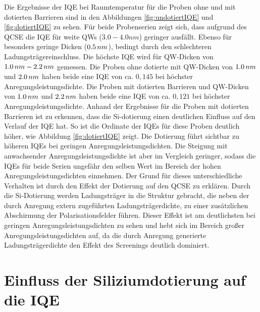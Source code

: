 \noindent 
Die Ergebnisse der IQE bei Raumtemperatur für die Proben ohne und mit dotierten Barrieren sind in den Abbildungen 
\ref{fig:undotiertIQE} und \ref{fig:dotiertIQE} zu sehen. Für beide Probenserien zeigt sich, dass aufgrund des QCSE die IQE für weite QWs 
($3.0 -4.0  nm$) geringer ausfällt. Ebenso für besonders geringe Dicken ($0.5\thinspace nm$), bedingt durch den schlechteren Ladungsträgereinschluss. Die höchste IQE wird für QW-Dicken von $1.0 \thinspace nm- 2.2 \thinspace nm$ gemessen. Die Proben ohne dotierte mit QW-Dicken von $1.0 \thinspace nm$ und $2.0\thinspace nm$ haben beide eine IQE von ca. $0,145$ bei höchster Anregungsleistungsdichte.
\newline
Die Proben mit dotierten Barrieren und QW-Dicken von $1.0 \thinspace nm$ und $2.2\thinspace nm$ haben beide eine IQE von ca. $0,121$ bei höchster Anregungsleistungsdichte. 
\newline
Anhand der Ergebnisse für die Proben mit dotierten Barrieren ist zu erkennen, dass die Si-dotierung einen deutlichen Einfluss auf den Verlauf der IQE hat. So ist die Ordinate der IQEs für diese Proben deutlich höher, wie Abbildung \ref{fig:dotiertIQE} zeigt. Die Dotierung führt sichtbar zu höheren IQEs bei geringen Anregungsleistungsdichten. Die Steigung mit anwachsender Anregungsleistungsdichte ist aber im Vergleich geringer, sodass die IQEs für beide Serien ungefähr den selben Wert im Bereich der hohen Anregungsleistungsdichten einnehmen. 
\newline
Der Grund für dieses unterschiedliche Verhalten ist durch den Effekt der Dotierung auf den QCSE zu erklären. Durch die Si-Dotierung werden Ladungsträger in die Struktur gebracht, die neben der durch Anregung extern zugeführten Ladungsträgerdichte, zu einer zusätzlichen Abschirmung der Polarisationsfelder führen. Dieser Effekt ist am deutlichsten bei geringen Anregungsleistungsdichten zu sehen und hebt sich im Bereich großer Anregungsleistungsdichten auf, da die durch Anregung generierte Ladungsträgerdichte den Effekt des Screenings deutlich dominiert.

\iffalse
\section{Einfluss der Siliziumdotierung auf die IQE}


